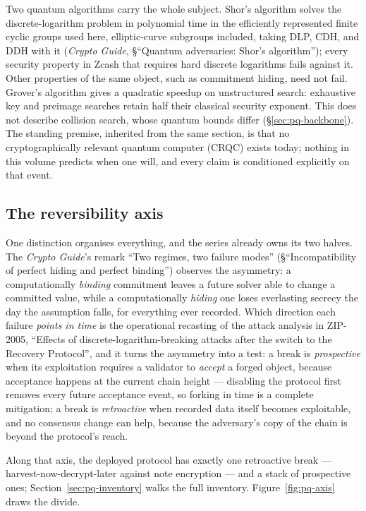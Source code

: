 \documentclass[11pt,a4paper]{article}
\theoremstyle{definition}
\begin{document}
Two quantum algorithms carry the whole subject. Shor's algorithm solves
the discrete-logarithm problem in polynomial time in the efficiently
represented finite cyclic groups used here, elliptic-curve subgroups
included, taking DLP, CDH, and DDH with it (\emph{Crypto
Guide}, \S``Quantum adversaries: Shor's algorithm''); every
security property in Zcash that requires hard discrete logarithms fails
against it. Other properties of the same object, such as commitment
hiding, need not fail. Grover's algorithm
gives a quadratic speedup on unstructured search: exhaustive key and
preimage searches retain half their classical security exponent. This
does not describe collision search, whose quantum bounds differ
(\S\ref{sec:pq-backbone}). The standing premise,
inherited from the same section, is that no cryptographically relevant
quantum computer (CRQC) exists today; nothing in this volume predicts
when one will, and every claim is conditioned explicitly on that event.

\subsection{The reversibility axis}\label{sec:pq-axis}

One distinction organises everything, and the series already owns its
two halves. The \emph{Crypto Guide}'s remark ``Two regimes, two failure
modes'' (\S``Incompatibility of perfect hiding and perfect binding'')
observes the asymmetry: a computationally \emph{binding} commitment
leaves a future solver able to change a committed value, while a
computationally \emph{hiding} one loses everlasting secrecy the day the
assumption falls, for everything ever recorded. Which direction each
failure \emph{points in time} is the operational recasting of the attack
analysis in ZIP-2005, ``Effects of discrete-logarithm-breaking attacks after
the switch to the Recovery Protocol'', and it turns the asymmetry into a
test: a break
is \emph{prospective} when its
exploitation requires a validator to \emph{accept} a forged object,
because acceptance happens at the current chain height --- disabling
the protocol first removes every future acceptance event, so forking in
time is a complete mitigation; a break is \emph{retroactive} when
recorded data itself becomes exploitable, and no consensus change can
help, because the adversary's copy of the chain is beyond the
protocol's reach.

Along that axis, the deployed protocol has exactly one retroactive
break --- harvest-now-decrypt-later against note encryption --- and a
stack of prospective ones; Section~\ref{sec:pq-inventory} walks the full
inventory. Figure~\ref{fig:pq-axis} draws the divide.
\end{document}
